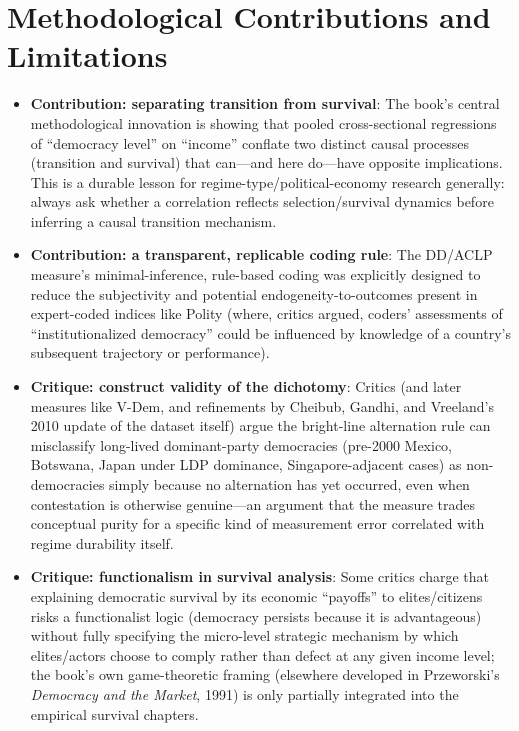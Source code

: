 \documentclass[12pt]{article}
\begin{document}
\section{Methodological Contributions and Limitations}

\begin{itemize}[leftmargin=*, itemsep=4pt]
    \item \textbf{Contribution: separating transition from survival}: The book's central methodological innovation is showing that pooled cross-sectional regressions of ``democracy level'' on ``income'' conflate two distinct causal processes (transition and survival) that can---and here do---have opposite implications. This is a durable lesson for regime-type/political-economy research generally: always ask whether a correlation reflects selection/survival dynamics before inferring a causal transition mechanism.
    \item \textbf{Contribution: a transparent, replicable coding rule}: The DD/ACLP measure's minimal-inference, rule-based coding was explicitly designed to reduce the subjectivity and potential endogeneity-to-outcomes present in expert-coded indices like Polity (where, critics argued, coders' assessments of ``institutionalized democracy'' could be influenced by knowledge of a country's subsequent trajectory or performance).
    \item \textbf{Critique: construct validity of the dichotomy}: Critics (and later measures like V-Dem, and refinements by Cheibub, Gandhi, and Vreeland's 2010 update of the dataset itself) argue the bright-line alternation rule can misclassify long-lived dominant-party democracies (pre-2000 Mexico, Botswana, Japan under LDP dominance, Singapore-adjacent cases) as non-democracies simply because no alternation has yet occurred, even when contestation is otherwise genuine---an argument that the measure trades conceptual purity for a specific kind of measurement error correlated with regime durability itself.
    \item \textbf{Critique: functionalism in survival analysis}: Some critics charge that explaining democratic survival by its economic ``payoffs'' to elites/citizens risks a functionalist logic (democracy persists because it is advantageous) without fully specifying the micro-level strategic mechanism by which elites/actors choose to comply rather than defect at any given income level; the book's own game-theoretic framing (elsewhere developed in Przeworski's \textit{Democracy and the Market}, 1991) is only partially integrated into the empirical survival chapters.

\end{itemize}
\end{document}
